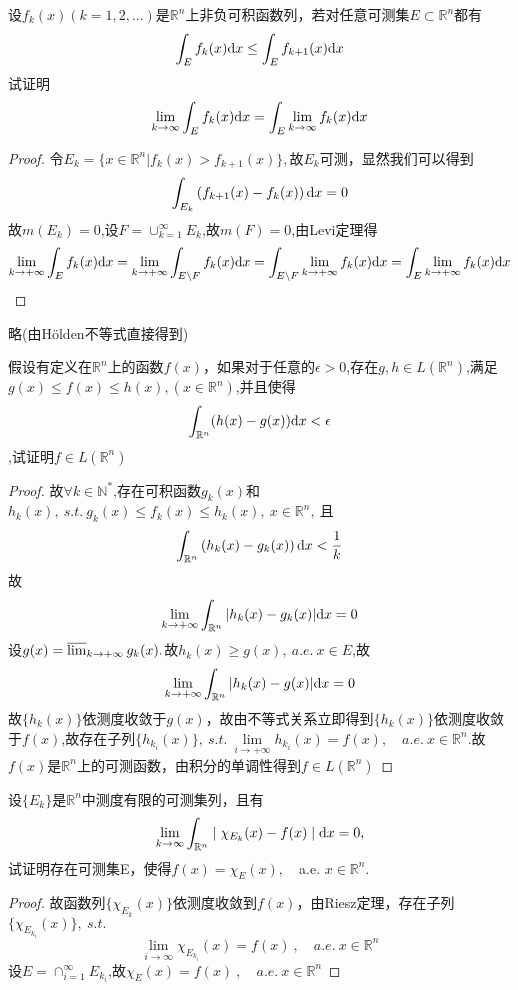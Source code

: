 设$f_k(x)(k=1,2,...)$是$\mathbb{R}^{n}$上非负可积函数列，若对任意可测集$E \subset \mathbb{R}^{n}$都有$$\int_E f_k(x) \mathrm{d}x \leq \int_E f_{k+1}(x) \mathrm{d}x$$试证明$$\lim\limits_{k \to \infty}\int_E f_k(x) \mathrm{d}x = \int_E \lim\limits_{k \to \infty}f_k(x) \mathrm{d}x$$
\begin{proof}
令$E_k=\{x\in \mathbb{R}^n|f_k(x)>f_{k+1}(x)\},$故$E_k$可测，显然我们可以得到$$\int_{E_k}\left(f_{k+1}(x)-f_k(x)\right)\mathrm{d}x=0$$故$m(E_k)=0$,设$F=\cup_{k=1}^{\infty}E_k$,故$m(F)=0$,由Levi定理得
$$\lim\limits_{k \to +\infty}\int_{E}f_k(x)\mathrm{d}x=\lim\limits_{k \to +\infty}\int_{E\setminus F}f_k(x)\mathrm{d}x=\int_{E\setminus F}\lim\limits_{k \to +\infty}f_k(x)\mathrm{d}x=\int_{E}\lim\limits_{k \to +\infty}f_k(x)\mathrm{d}x$$
\end{proof}


略(由H{\"o}lden不等式直接得到)


假设有定义在$\mathbb{R}^n$上的函数$f(x)$，如果对于任意的$\epsilon>0$,存在$g,h\in L(\mathbb{R}^n)$,满足$g(x) \leq f(x) \leq h(x),(x\in \mathbb{R}^n) $,并且使得$$\int_{\mathbb{R}^n}(h(x)-g(x)) \mathrm{d}x<\epsilon$$,试证明$f\in L(\mathbb{R}^n)$
\begin{proof}
故$\forall k\in \mathbb{N}^*$,存在可积函数$g_k(x)$和$h_k(x),\ s.t.\ g_k(x)\leq f_k(x)\leq h_k(x),\ x\in \mathbb{R}^n,\ $且$$\int_{\mathbb{R}^n}\left(h_k(x)-g_k(x)\right)\mathrm{d}x<\frac{1}{k}$$
故$$\lim\limits_{k \to +\infty}\int_{\mathbb{R}^n}|h_k(x)-g_k(x)|\mathrm{d}x=0$$设$g(x)=\varlimsup_{k \to +\infty}g_k(x).$故$h_k(x)\geq g(x),\ a.e.\ x \in E$,故$$\lim\limits_{k \to +\infty}\int_{\mathbb{R}^n}|h_k(x)-g(x)|\mathrm{d}x=0$$故$\{h_k(x)\}$依测度收敛于$g(x)$，故由不等式关系立即得到$\{h_k(x)\}$依测度收敛于$f(x)$,故存在子列$\{h_{k_i}(x)\},\ s.t.\ \lim\limits_{i \to +\infty}h_{k_i}(x)=f(x),\quad a.e.\  x\in \mathbb{R}^n$.故$f(x)$是$\mathbb{R}^n$上的可测函数，由积分的单调性得到$f\in L(\mathbb{R}^n)$
\end{proof}

设$\{E_k\}$是$\mathbb{R}^n$中测度有限的可测集列，且有$$\lim\limits_{k \to \infty}\int_{\mathbb{R}^n} \mid \chi_{E_k}(x)-f(x) \mid \mathrm{d}x=0,$$试证明存在可测集E，使得$f(x)=\chi_E(x),\quad$a.e. $x \in \mathbb{R}^n$.
\begin{proof}
故函数列$\{\chi_{E_k}(x)\}$依测度收敛到$f(x)$，由Riesz定理，存在子列$\{\chi_{E_{k_i}}(x)\},\ s.t.$ $$\lim\limits_{i\to\infty}\chi_{E_{k_i}}(x)=f(x)\ ,\quad a.e.\ x\in\mathbb{R}^n$$设$E=\cap_{i=1}^{\infty}E_{k_i}$,故$\chi_{E}(x)=f(x)\ ,\quad a.e. \ x\in \mathbb{R}^n$
\end{proof}



